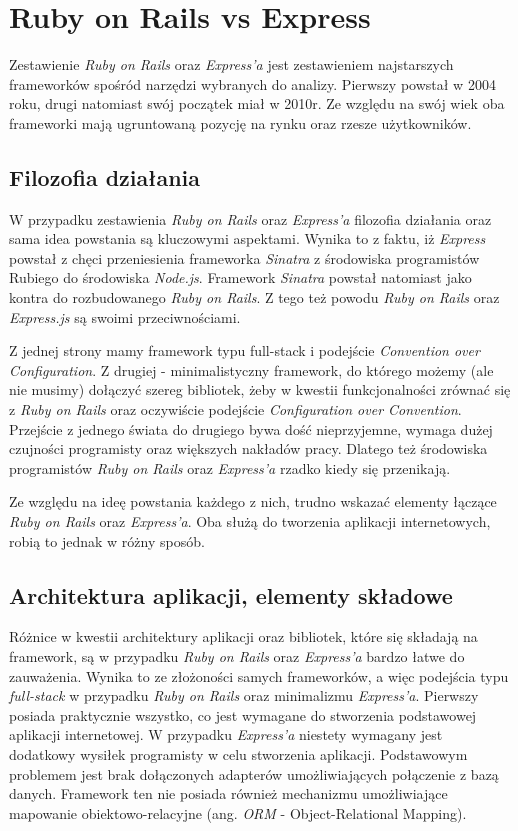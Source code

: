 \documentclass[mgr,oneside]{mgr}
\begin{document}
\section{Ruby on Rails vs Express}
Zestawienie \textit{Ruby on Rails} oraz \textit{Express'a} jest zestawieniem najstarszych frameworków spośród narzędzi wybranych do analizy. Pierwszy powstał w 2004 roku, drugi natomiast swój początek miał w 2010r. Ze względu na swój wiek oba frameworki mają ugruntowaną pozycję na rynku oraz rzesze użytkowników.

\subsection{Filozofia działania}
W przypadku zestawienia \textit{Ruby on Rails} oraz \textit{Express'a} filozofia działania oraz sama idea powstania są kluczowymi aspektami. Wynika to z faktu, iż \textit{Express} powstał z chęci przeniesienia frameworka \textit{Sinatra} z środowiska programistów Rubiego do środowiska \textit{Node.js}. Framework \textit{Sinatra} powstał natomiast jako kontra do rozbudowanego \textit{Ruby on Rails}. Z tego też powodu \textit{Ruby on Rails} oraz \textit{Express.js} są swoimi przeciwnościami.

Z jednej strony mamy framework typu full-stack i podejście \textit{Convention over Configuration}. Z drugiej - minimalistyczny framework, do którego możemy (ale nie musimy) dołączyć szereg bibliotek, żeby w kwestii funkcjonalności zrównać się z \textit{Ruby on Rails} oraz oczywiście podejście \textit{Configuration over Convention}. Przejście z jednego świata do drugiego bywa dość nieprzyjemne, wymaga dużej czujności programisty oraz większych nakładów pracy. Dlatego też środowiska programistów \textit{Ruby on Rails} oraz \textit{Express'a} rzadko kiedy się przenikają.

Ze względu na ideę powstania każdego z nich, trudno wskazać elementy łączące \textit{Ruby on Rails} oraz \textit{Express'a}. Oba służą do tworzenia aplikacji internetowych, robią to jednak w różny sposób.

\subsection{Architektura aplikacji, elementy składowe}
\label{rails_express:architektura}
Różnice w kwestii architektury aplikacji oraz bibliotek, które się składają na framework, są w przypadku \textit{Ruby on Rails} oraz \textit{Express'a} bardzo łatwe do zauważenia. Wynika to ze złożoności samych frameworków, a więc podejścia typu \textit{full-stack} w przypadku \textit{Ruby on Rails} oraz minimalizmu \textit{Express'a}. Pierwszy posiada praktycznie wszystko, co jest wymagane do stworzenia podstawowej aplikacji internetowej. W przypadku \textit{Express'a} niestety wymagany jest dodatkowy wysiłek programisty w celu stworzenia aplikacji. Podstawowym problemem jest brak dołączonych adapterów umożliwiających połączenie z bazą danych. Framework ten nie posiada również mechanizmu umożliwiające mapowanie obiektowo-relacyjne (ang. \textit{ORM} - Object-Relational Mapping).
\end{document}
